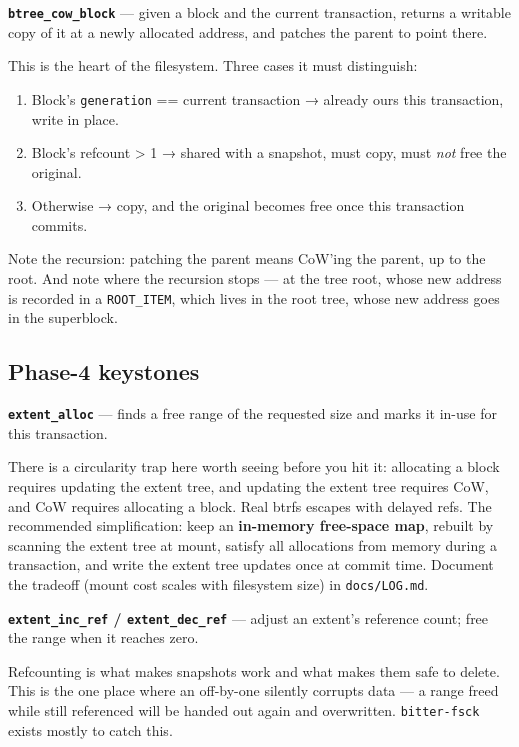 \textbf{\texttt{btree\_cow\_block}} --- given a block and the current transaction, returns a writable copy
of it at a newly allocated address, and patches the parent to point there.

This is the heart of the filesystem. Three cases it must distinguish:

\begin{enumerate}
\def\labelenumi{\arabic{enumi}.}
\tightlist
\item
  Block's \texttt{generation} == current transaction → already ours this transaction, write in place.
\item
  Block's refcount \textgreater{} 1 → shared with a snapshot, must copy, must \emph{not} free the original.
\item
  Otherwise → copy, and the original becomes free once this transaction commits.
\end{enumerate}

Note the recursion: patching the parent means CoW'ing the parent, up to the root. And note
where the recursion stops --- at the tree root, whose new address is recorded in a
\texttt{ROOT\_ITEM}, which lives in the root tree, whose new address goes in the superblock.

\hypertarget{phase-4-keystones}{%
\subsection{Phase-4 keystones}\label{phase-4-keystones}}

\textbf{\texttt{extent\_alloc}} --- finds a free range of the requested size and marks it in-use for this
transaction.

There is a circularity trap here worth seeing before you hit it: allocating a block
requires updating the extent tree, and updating the extent tree requires CoW, and CoW
requires allocating a block. Real btrfs escapes with delayed refs. The recommended
simplification: keep an \textbf{in-memory free-space map}, rebuilt by scanning the extent tree
at mount, satisfy all allocations from memory during a transaction, and write the extent
tree updates once at commit time. Document the tradeoff (mount cost scales with
filesystem size) in \texttt{docs/LOG.md}.

\textbf{\texttt{extent\_inc\_ref} / \texttt{extent\_dec\_ref}} --- adjust an extent's reference count; free the
range when it reaches zero.

Refcounting is what makes snapshots work and what makes them safe to delete. This is the
one place where an off-by-one silently corrupts data --- a range freed while still
referenced will be handed out again and overwritten. \texttt{bitter-fsck} exists mostly to catch
this.


